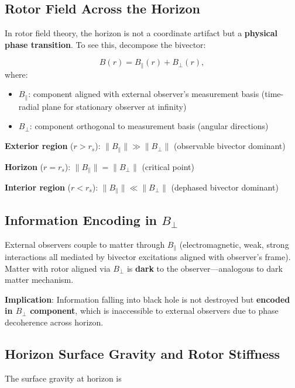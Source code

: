 \documentclass[11pt,a4paper]{article}
\numberwithin{equation}{section}
\theoremstyle{plain}
\theoremstyle{definition}
\theoremstyle{remark}
\begin{document}
\subsection{Rotor Field Across the Horizon}

In rotor field theory, the horizon is not a coordinate artifact but a \textbf{physical phase transition}. To see this, decompose the bivector:

\begin{equation}
B(r) = B_\parallel(r) + B_\perp(r),
\label{eq:bivector-decomposition}
\end{equation}
where:
\begin{itemize}
\item $B_\parallel$: component aligned with external observer's measurement basis (time-radial plane for stationary observer at infinity)
\item $B_\perp$: component orthogonal to measurement basis (angular directions)
\end{itemize}

\textbf{Exterior region} ($r > r_s$): $\|B_\parallel\| \gg \|B_\perp\|$ (observable bivector dominant)

\textbf{Horizon} ($r = r_s$): $\|B_\parallel\| = \|B_\perp\|$ (critical point)

\textbf{Interior region} ($r < r_s$): $\|B_\parallel\| \ll \|B_\perp\|$ (dephased bivector dominant)

\subsection{Information Encoding in $B_\perp$}

External observers couple to matter through $B_\parallel$ (electromagnetic, weak, strong interactions all mediated by bivector excitations aligned with observer's frame). Matter with rotor aligned via $B_\perp$ is \textbf{dark} to the observer—analogous to dark matter mechanism.

\textbf{Implication}: Information falling into black hole is not destroyed but \textbf{encoded in $B_\perp$ component}, which is inaccessible to external observers due to phase decoherence across horizon.

\subsection{Horizon Surface Gravity and Rotor Stiffness}

The surface gravity at horizon is
\end{document}
